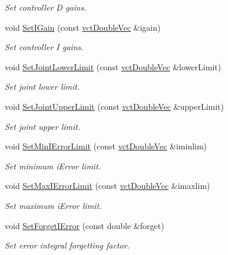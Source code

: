 \begin{DoxyCompactItemize}
\begin{DoxyCompactList}\small\item\em Set controller D gains. \end{DoxyCompactList}\item 
void \hyperlink{classmts_p_i_d_a286f0cdbc59708eac21f8635105f0dd0}{Set\+I\+Gain} (const \hyperlink{vct_dynamic_vector_types_8h_ade4b3068c86fb88f41af2e5187e491c2}{vct\+Double\+Vec} \&igain)
\begin{DoxyCompactList}\small\item\em Set controller I gains. \end{DoxyCompactList}\item 
void \hyperlink{classmts_p_i_d_a15bba897773af7b17971ddbddfa4c8f4}{Set\+Joint\+Lower\+Limit} (const \hyperlink{vct_dynamic_vector_types_8h_ade4b3068c86fb88f41af2e5187e491c2}{vct\+Double\+Vec} \&lower\+Limit)
\begin{DoxyCompactList}\small\item\em Set joint lower limit. \end{DoxyCompactList}\item 
void \hyperlink{classmts_p_i_d_abfb71b1931f3664e87729f2e2b22be55}{Set\+Joint\+Upper\+Limit} (const \hyperlink{vct_dynamic_vector_types_8h_ade4b3068c86fb88f41af2e5187e491c2}{vct\+Double\+Vec} \&upper\+Limit)
\begin{DoxyCompactList}\small\item\em Set joint upper limit. \end{DoxyCompactList}\item 
void \hyperlink{classmts_p_i_d_a93201139fc34fbcb71046ed27e618d34}{Set\+Min\+I\+Error\+Limit} (const \hyperlink{vct_dynamic_vector_types_8h_ade4b3068c86fb88f41af2e5187e491c2}{vct\+Double\+Vec} \&iminlim)
\begin{DoxyCompactList}\small\item\em Set minimum i\+Error limit. \end{DoxyCompactList}\item 
void \hyperlink{classmts_p_i_d_a742fd6c148873f962b28661fb448b81d}{Set\+Max\+I\+Error\+Limit} (const \hyperlink{vct_dynamic_vector_types_8h_ade4b3068c86fb88f41af2e5187e491c2}{vct\+Double\+Vec} \&imaxlim)
\begin{DoxyCompactList}\small\item\em Set maximum i\+Error limit. \end{DoxyCompactList}\item 
void \hyperlink{classmts_p_i_d_a1fd0c497970ebd8f20147e7087abccc1}{Set\+Forget\+I\+Error} (const double \&forget)
\begin{DoxyCompactList}\small\item\em Set error integral forgetting factor. \end{DoxyCompactList}\end{DoxyCompactItemize}
